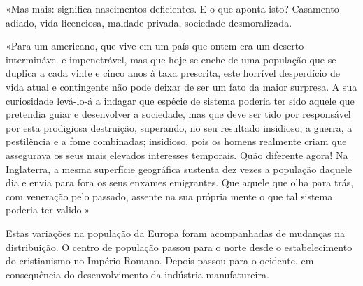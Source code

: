 \documentclass[11pt,a5paper,twoside,openany]{book}
\begin{document}
«Mas mais: significa nascimentos deficientes. E o que aponta isto? Casamento adiado, vida licenciosa, maldade privada, sociedade desmoralizada.

«Para um americano, que vive em um país que ontem era um deserto interminável e impenetrável, mas que hoje se enche de uma população que se duplica a cada vinte e cinco anos à taxa prescrita, este horrível desperdício de vida atual e contingente não pode deixar de ser um fato da maior surpresa. A sua curiosidade levá-lo-á a indagar que espécie de sistema poderia ter sido aquele que pretendia guiar e desenvolver a sociedade, mas que deve ser tido por responsável por esta prodigiosa destruição, superando, no seu resultado insidioso, a guerra, a pestilência e a fome combinadas; insidioso, pois os homens realmente criam que assegurava os seus mais elevados interesses temporais. Quão diferente agora! Na Inglaterra, a mesma superfície geográfica sustenta dez vezes a população daquele dia e envia para fora os seus enxames emigrantes. Que aquele que olha para trás, com veneração pelo passado, assente na sua própria mente o que tal sistema poderia ter valido.»

Estas variações na população da Europa foram acompanhadas de mudanças na distribuição. O centro de população passou para o norte desde o estabelecimento do cristianismo no Império Romano. Depois passou para o ocidente, em consequência do desenvolvimento da indústria manufatureira.
\end{document}
